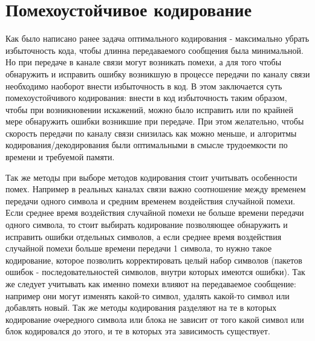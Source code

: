 \documentclass[14pt,a4paper,russian]{article}
\begin{document}
\section{Помехоустойчивое кодирование}
Как было написано ранее задача оптимального кодирования - максимально убрать избыточность кода, чтобы длинна передаваемого сообщения была минимальной. Но при передаче в канале связи могут возникать помехи, а для того чтобы обнаружить и исправить ошибку возникшую в процессе передачи по каналу связи необходимо наоборот внести избыточность в код. В этом заключается суть помехоустойчивого кодирования: внести в код избыточность таким образом, чтобы при возникновении искажений, можно было исправить или по крайней мере обнаружить ошибки возникшие при передаче. При этом желательно, чтобы скорость передачи по каналу связи снизилась как можно меньше, и алгоритмы кодирования/декодирования были оптимальными в смысле трудоемкости по времени и требуемой памяти.

Так же методы при выборе методов кодирования стоит учитывать особенности помех. Например в реальных каналах связи важно соотношение между временем передачи одного символа и средним временем воздействия случайной помехи. Если среднее время воздействия случайной помехи не больше времени передачи одного символа, то стоит выбирать кодирование позволяющее обнаружить и исправить ошибки отдельных символов, а если среднее время воздействия случайной помехи больше времени передачи 1 символа, то нужно такое кодирование, которое позволить корректировать целый набор символов (пакетов ошибок - последовательностей символов, внутри которых имеются ошибки). Так же следует учитывать как именно помехи влияют на передаваемое сообщение: например они могут изменять какой-то символ, удалять какой-то символ или добавлять новый. Так же методы кодирования разделяют на те в которых кодирование очередного символа или блока не зависит от того какой символ или блок кодировался до этого, и те в которых эта зависимость существует.
\end{document}
